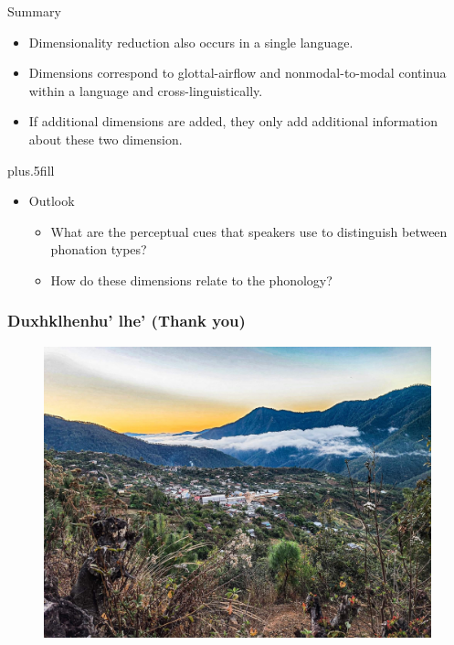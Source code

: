 \documentclass[professionalfont]{beamer}
\begin{document}
\begin{frame}{Summary}

  \begin{itemize}
  \item Dimensionality reduction also occurs in a single language.
  \item Dimensions correspond to glottal-airflow and nonmodal-to-modal continua within a language and cross-linguistically.
  \item If additional dimensions are added, they only add additional information about these two dimension.
  \end{itemize}
  
  \vskip0pt plus.5fill
  \begin{itemize}
  \item
    Outlook
    \begin{itemize}
    \item What are the perceptual cues that speakers use to distinguish between phonation types?
    \item How do these dimensions relate to the phonology?
    \end{itemize}
  \end{itemize}
\end{frame}

\begin{frame}
  \frametitle{Duxhklhenhu' lhe' (Thank you)}
  \begin{figure}[h!]
    \centering
    \includegraphics[width = \linewidth]{images/SantiagoLaxopa.jpeg}
  \end{figure}
\end{frame}
\end{document}
